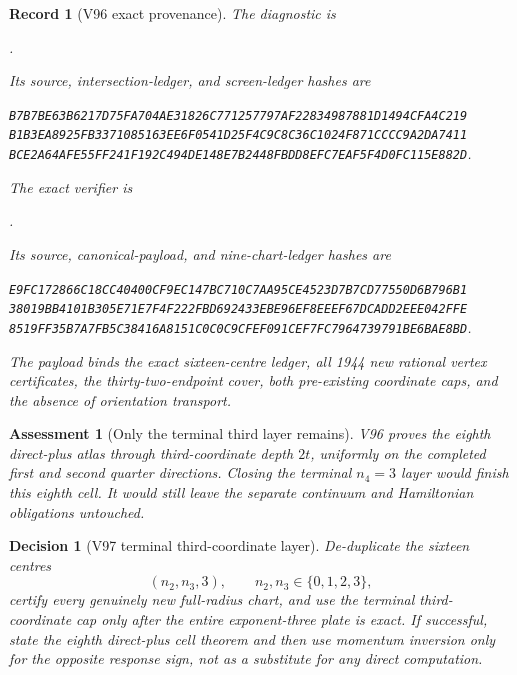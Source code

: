 \documentclass[11pt,oneside]{article}
\newtheorem{assessment}[theorem]{Assessment}
\newtheorem{record}[theorem]{Record}
\newtheorem{decision}[theorem]{Decision}
\theoremstyle{definition}
\theoremstyle{remark}
\begin{document}
\begin{record}[V96 exact provenance]
\label{rec:newv96-provenance}
The diagnostic is
\begin{center}\footnotesize
{}.
\end{center}
Its source, intersection-ledger, and screen-ledger hashes are
\begin{center}\scriptsize
\texttt{B7B7BE63B6217D75FA704AE31826C771257797AF22834987881D1494CFA4C219}\\
\texttt{B1B3EA8925FB3371085163EE6F0541D25F4C9C8C36C1024F871CCCC9A2DA7411}\\
\texttt{BCE2A64AFE55FF241F192C494DE148E7B2448FBDD8EFC7EAF5F4D0FC115E882D}.
\end{center}
The exact verifier is
\begin{center}\footnotesize
{}.
\end{center}
Its source, canonical-payload, and nine-chart-ledger hashes are
\begin{center}\scriptsize
\texttt{E9FC172866C18CC40400CF9EC147BC710C7AA95CE4523D7B7CD77550D6B796B1}\\
\texttt{38019BB4101B305E71E7F4F222FBD692433EBE96EF8EEEF67DCADD2EEE042FFE}\\
\texttt{8519FF35B7A7FB5C38416A8151C0C0C9CFEF091CEF7FC7964739791BE6BAE8BD}.
\end{center}
The payload binds the exact sixteen-centre ledger, all 1944 new
rational vertex certificates, the thirty-two-endpoint cover, both
pre-existing coordinate caps, and the absence of orientation
transport.
\end{record}

\begin{assessment}[Only the terminal third layer remains]
\label{ass:newv96}
V96 proves the eighth direct-plus atlas through third-coordinate
depth \(2t\), uniformly on the completed first and second quarter
directions.  Closing the terminal \(n_4=3\) layer would finish this
eighth cell.  It would still leave the separate continuum and
Hamiltonian obligations untouched.
\end{assessment}

\begin{decision}[V97 terminal third-coordinate layer]
\label{dec:newv96-next}
De-duplicate the sixteen centres
\[
 (n_2,n_3,3),\qquad n_2,n_3\in\{0,1,2,3\},          \tag{96.12}
\]
certify every genuinely new full-radius chart, and use the terminal
third-coordinate cap only after the entire exponent-three plate is
exact.  If successful, state the eighth direct-plus cell theorem
and then use momentum inversion only for the opposite response
sign, not as a substitute for any direct computation.
\end{decision}
\end{document}
